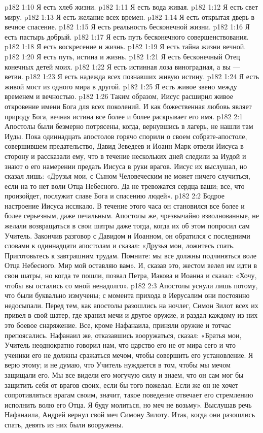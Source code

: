 \vs p182 1:10 Я есть хлеб жизни.
\vs p182 1:11 Я есть вода живая.
\vs p182 1:12 Я есть свет миру.
\vs p182 1:13 Я есть желание всех времен.
\vs p182 1:14 Я есть открытая дверь в вечное спасение.
\vs p182 1:15 Я есть реальность бесконечной жизни.
\vs p182 1:16 Я есть пастырь добрый.
\vs p182 1:17 Я есть путь бесконечного совершенствования.
\vs p182 1:18 Я есть воскресение и жизнь.
\vs p182 1:19 Я есть тайна жизни вечной.
\vs p182 1:20 Я есть путь, истина и жизнь.
\vs p182 1:21 Я есть бесконечный Отец конечных детей моих.
\vs p182 1:22 Я есть истинная лоза виноградная, а вы --- ветви.
\vs p182 1:23 Я есть надежда всех познавших живую истину.
\vs p182 1:24 Я есть живой мост из одного мира в другой.
\vs p182 1:25 Я есть живое звено между временем и вечностью.
\vs p182 1:26 \pc Таким образом, Иисус расширил живое откровение имени Бога для всех поколений. И как божественная любовь являет природу Бога, вечная истина все более и более раскрывает его имя.
\vs p182 2:1 Апостолы были безмерно потрясены, когда, вернувшись в лагерь, не нашли там Иуды. Пока одиннадцать апостолов горячо спорили о своем собрате\hyp{}апостоле, совершившем предательство, Давид Зеведеев и Иоанн Марк отвели Иисуса в сторону и рассказали ему, что в течение нескольких дней следили за Иудой и знают о его намерении предать Иисуса в руки врагов. Иисус их выслушал, но сказал лишь: «Друзья мои, с Сыном Человеческим не может ничего случиться, если на то нет воли Отца Небесного. Да не тревожатся сердца ваши; все, что произойдет, послужит славе Бога и спасению людей».
\vs p182 2:2 Бодрое настроение Иисуса иссякало. В течение этого часа он становился все более и более серьезным, даже печальным. Апостолы же, чрезвычайно взволнованные, не желали возвращаться в свои шатры даже тогда, когда их об этом попросил сам Учитель. Закончив разговор с Давидом и Иоанном, он обратился с последними словами к одиннадцати апостолам и сказал: «Друзья мои, ложитесь спать. Приготовьтесь к завтрашним трудам. Помните: мы все должны подчиняться воле Отца Небесного. Мир мой оставляю вам». И, сказав это, жестом велел им идти в свои шатры, но когда те пошли, позвал Петра, Иакова и Иоанна и сказал: «Хочу, чтобы вы остались со мной ненадолго».
\vs p182 2:3 Апостолы уснули лишь потому, что были буквально измучены; с момента прихода в Иерусалим они постоянно недосыпали. Перед тем, как апостолы разошлись на ночлег, Симон Зилот всех их привел в свой шатер, где хранил мечи и другое оружие, и раздал каждому из них это боевое снаряжение. Все, кроме Нафанаила, приняли оружие и тотчас препоясались. Нафанаил же, отказавшись вооружаться, сказал: «Братья мои, Учитель неоднократно говорил нам, что царство его не от мира сего и что ученики его не должны сражаться мечом, чтобы совершить его установление. Я верю этому; и не думаю, что Учитель нуждается в том, чтобы мы мечом защищали его. Мы все видели его могучую силу и знаем, что он сам мог бы защитить себя от врагов своих, если бы того пожелал. Если же он не хочет сопротивляться врагам своим, значит, такое поведение отвечает его стремлению исполнить волю его Отца. Я буду молиться, но меч не возьму». Выслушав речь Нафанаила, Андрей вернул свой меч Симону Зилоту. Итак, когда они разошлись спать, девять из них были вооружены.

